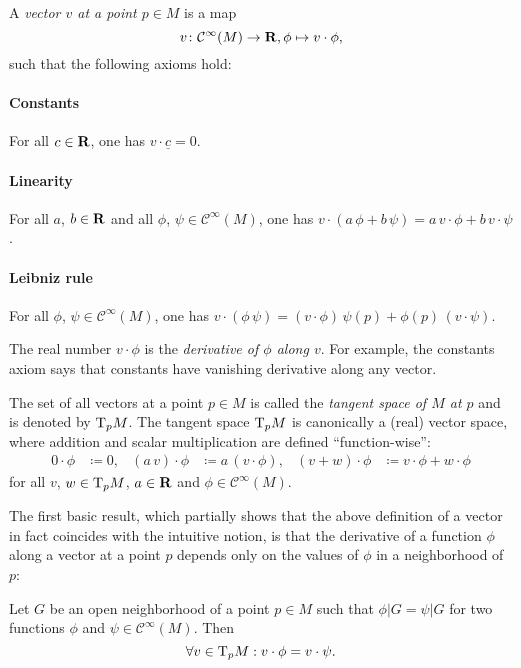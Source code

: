 \begin{dfn}
  A \emph{vector $v$ at a point $p \in M$} is a map
  \[
    v\colon \mathcal C^\infty(M) \to \mathbf{R}, \phi \mapsto v \cdot \phi,
  \]
  such that the following axioms hold:
  
  \paragraph{Constants}
  For all $c \in \mathbf{R}$, one has $v \cdot \underline c = 0$.

  \paragraph{Linearity}
  For all $a$, $b \in \mathbf{R}$ and all $\phi$, $\psi \in \mathcal C^\infty(M)$,
  one has $v \cdot (a \, \phi + b \, \psi) = a \, v \cdot \phi + b \, v \cdot \psi$.
  
  \paragraph{Leibniz rule}
  For all $\phi$, $\psi \in \mathcal C^\infty(M)$, one has
  $v \cdot (\phi \, \psi) = (v \cdot \phi) \, \psi(p) + \phi(p) \, (v \cdot \psi)$.
\end{dfn} 

The real number $v \cdot \phi$ is the \emph{derivative of $\phi$ along $v$}. For
example, the constants axiom says that constants have vanishing derivative along
any vector.

The set of all vectors at a point $p \in M$ is called the \emph{tangent space
of $M$ at $p$} and is denoted by $\mathrm T_p M$. The tangent space $\mathrm T_p M$ is
canonically a (real) vector space, where addition and scalar multiplication
are defined ``function-wise'':
\begin{align*}
  0 \cdot \phi & \coloneqq 0,&
  (a \, v) \cdot \phi & \coloneqq a \, (v \cdot \phi), &
  (v + w) \cdot \phi & \coloneqq v \cdot \phi + w \cdot \phi
\end{align*}
for all $v$, $w \in \mathrm T_p M$, $a \in \mathbf{R}$ and $\phi \in \mathcal C^\infty(M)$.

The first basic result, which partially shows that the above definition of a 
vector in fact coincides with the intuitive notion, is that the derivative of
a function $\phi$ along a vector at a point $p$ depends only on the values of $\phi$
in a neighborhood of $p$:

\begin{lem}
  Let $G$ be an open neighborhood of a point $p \in M$ such that $\phi|G = \psi|G$
  for two functions $\phi$ and $\psi \in \mathcal C^\infty(M)$. Then
  \[
    \forall v \in \mathrm T_p M: v \cdot \phi = v \cdot \psi.
  \]
\end{lem}

